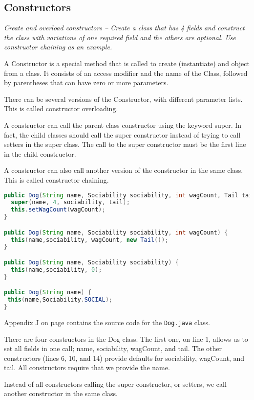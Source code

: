 \subsection{Constructors}
\textit{Create and overload constructors -- Create a class that has 4 fields and construct the class with variations of one required field and the others are optional.  Use constructor chaining as an example.}

A Constructor is a special method that is called to create (instantiate) and object from a class. It consists of an access modifier and the name of the Class, followed by parentheses that can have zero or more parameters.

There can be several versions of the Constructor, with different parameter lists. This is called constructor overloading.

A constructor can call the parent class constructor using the keyword super. In fact, the child classes should call the super constructor instead of trying to call setters in the super class. The call to the super constructor must be the first line in the child constructor.

A constructor can also call another version of the constructor in the same class. This is called constructor chaining.

\begin{lstlisting}[language=Java]
public Dog(String name, Sociability sociability, int wagCount, Tail tail) {
  super(name, 4, sociability, tail);
  this.setWagCount(wagCount);
}

public Dog(String name, Sociability sociability, int wagCount) {
  this(name,sociability, wagCount, new Tail());
}

public Dog(String name, Sociability sociability) {
  this(name,sociability, 0);
}

public Dog(String name) {
 this(name,Sociability.SOCIAL);
}
\end{lstlisting}\label{code:constructors} 

Appendix J on page \pageref{App:AppendixJ} contains the source code for the \texttt{Dog.java} class.

There are four constructors in the Dog class. The first one, on line 1,  allows us to set all fields in one call; name, sociability, wagCount, and tail. The other constructors (lines 6, 10, and 14) provide defaults for sociability, wagCount, and tail. All constructors require that we provide the name.

Instead of all constructors calling the super constructor, or setters, we call another constructor in the same class.

